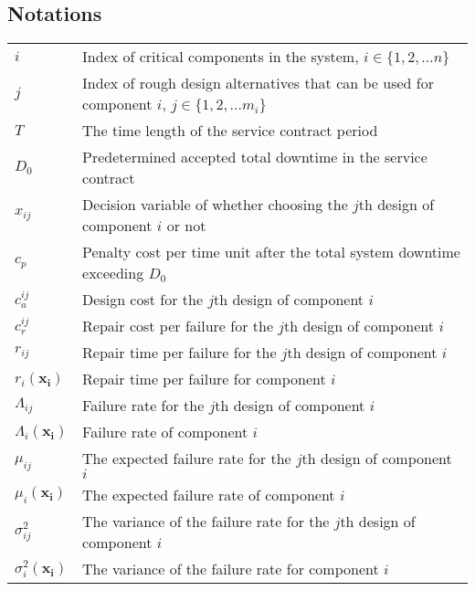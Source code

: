 \documentclass[preprint,12pt]{elsarticle}
\begin{document}
 \subsection{Notations}
   \begin{tabular}{l l}
$i$ & Index of critical components in the system, $i \in \{1,2,...n\}$\\
$j$ & Index of rough design alternatives that can be used for component $i$, $j \in \{1,2,...m_{i}\}$\\
$T$ & The time length of the service contract period\\
$D_0$ & Predetermined accepted total downtime in the service contract\\
$x_{ij}$ & Decision variable of whether choosing the $j$th design of component $i$ or not\\
$c_p$ & Penalty cost per time unit after the total system downtime exceeding $D_0$\\
$c^{ij}_{a}$ & Design cost for the $j$th design of component $i$\\
$c_r^{ij}$ & Repair cost per failure for the $j$th design of component $i$\\
$r_{ij}$ & Repair time per failure for the $j$th design of component $i$\\
$r_{i}(\boldsymbol{x_{i}})$ & Repair time per failure for component $i$\\
$\Lambda_{ij}$ & Failure rate for the $j$th design of component $i$\\
$\Lambda_{i}(\boldsymbol{x_{i}})$  & Failure rate of component $i$\\
$\mu_{ij}$ & The expected failure rate for the $j$th design of component $i$ \\
$\mu_{i}(\boldsymbol{x_{i}})$ & The expected failure rate of component $i$ \\
$\sigma_{ij}^{2}$ & The variance of the failure rate for the $j$th design of component $i$\\
$\sigma_{i}^{2}(\boldsymbol{x_{i}})$ &  The variance of the failure rate for component $i$ \\

\end{tabular}
\end{document}
